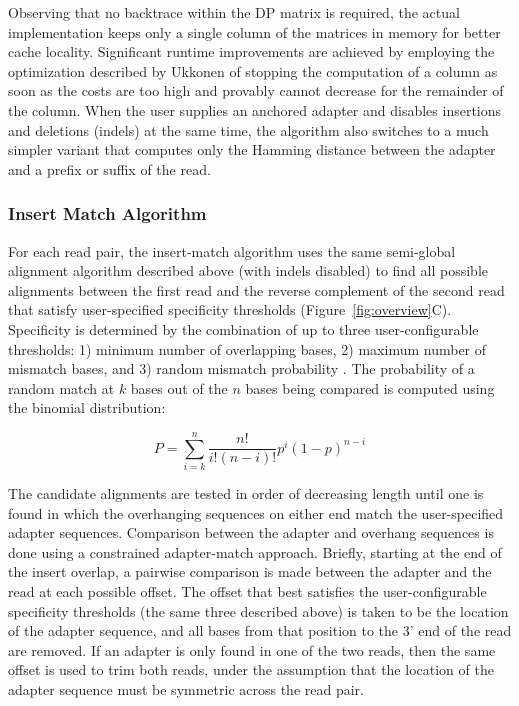 \documentclass[fleqn,10pt,lineno]{wlpeerj} %
\begin{document}
Observing that no backtrace within the DP matrix is required, the actual implementation keeps only a single column of the matrices in memory for better cache locality. Significant runtime improvements are achieved by employing the optimization described by Ukkonen \citep{Ukkonen1985Finding} of stopping the computation of a column as soon as the costs are too high and provably cannot decrease for the remainder of the column. When the user supplies an anchored adapter and disables insertions and deletions (indels) at the same time, the algorithm also switches to a much simpler variant that computes only the Hamming distance between the adapter and a prefix or suffix of the read.

\subsubsection{Insert Match Algorithm}\label{adapter}

For each read pair, the insert-match algorithm uses the same semi-global alignment algorithm described above (with indels disabled) to find all possible alignments between the first read and the reverse complement of the second read that satisfy user-specified specificity thresholds (Figure~\ref{fig:overview}C). Specificity is determined by the combination of up to three user-configurable thresholds: 1) minimum number of overlapping bases, 2) maximum number of mismatch bases, and 3) random mismatch probability \citep{sturm_seqpurge:_2016}. The probability of a random match at $\mathit{k}$ bases out of the $\mathit{n}$ bases being compared is computed using the binomial distribution:

\begin{equation}
P =\sum_{i=k}^{n} \frac{n!}{i! (n-i)!} p^{i} (1-p)^{n-i}
\label{eq:matchprob}
\end{equation}

The candidate alignments are tested in order of decreasing length until one is found in which the overhanging sequences on either end match the user-specified adapter sequences. Comparison between the adapter and overhang sequences is done using a constrained adapter-match approach. Briefly, starting at the end of the insert overlap, a pairwise comparison is made between the adapter and the read at each possible offset. The offset that best satisfies the user-configurable specificity thresholds (the same three described above) is taken to be the location of the adapter sequence, and all bases from that position to the 3' end of the read are removed. If an adapter is only found in one of the two reads, then the same offset is used to trim both reads, under the assumption that the location of the adapter sequence must be symmetric across the read pair.
\end{document}
